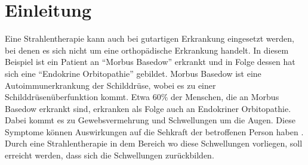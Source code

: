 \section{Einleitung}
\label{sec:Einleitung}


Eine Strahlentherapie kann auch bei gutartigen Erkrankung eingesetzt werden, bei
denen es sich nicht um eine orthopädische Erkrankung handelt.
In diesem Beispiel ist ein Patient an \enquote{Morbus Basedow} erkrankt und in Folge dessen
hat sich eine \enquote{Endokrine Orbitopathie} gebildet. Morbus Basedow ist eine Autoimmunerkrankung
der Schilddrüse, wobei es zu einer Schilddrüsenüberfunktion kommt. Etwa $60\%$ der Menschen, die
an Morbus Basedow erkrankt sind, erkranken als Folge auch an Endokriner Orbitopathie. Dabei kommt es zu
Gewebsvermehrung und Schwellungen um die Augen. Diese Symptome können Auswirkungen auf die Sehkraft der
betroffenen Person haben \cite{Endokrine}. Durch eine Strahlentherapie in dem Bereich wo diese Schwellungen vorliegen,
soll erreicht werden, dass sich die Schwellungen zurückbilden.
